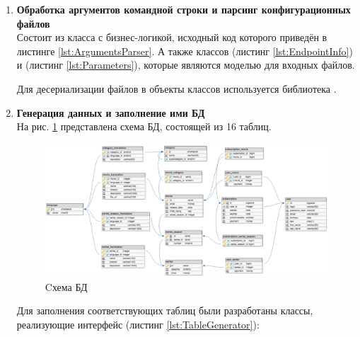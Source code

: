 \begin{enumerate}
	\item \textbf{Обработка аргументов командной строки и парсинг конфигурационных файлов}\\
	
	Состоит из класса  с бизнес-логикой, исходный код которого приведён в листинге \ref{lst:ArgumentsParser}. А также классов  (листинг \ref{lst:EndpointInfo}) и  (листинг \ref{lst:Parameters}), которые являются моделью для входных  файлов.
	
	Для десериализации  файлов в объекты классов используется библиотека .	
	
	\item \textbf{Генерация данных и заполнение ими БД}\\
	
	На рис. \ref{fig:movie-service-diagram} представлена схема БД, состоящей из 16 таблиц.
	
	\begin{figure}[H]
		\centering
		\includegraphics[width=1.0\textwidth]{../../lab2/diagrams/movie-service-diagram}
		\caption{Cхема БД}
		\label{fig:movie-service-diagram}
	\end{figure}
	
	Для заполнения соответствующих таблиц были разработаны классы, реализующие интерфейс  (листинг \ref{lst:TableGenerator}):
	

\end{enumerate}
